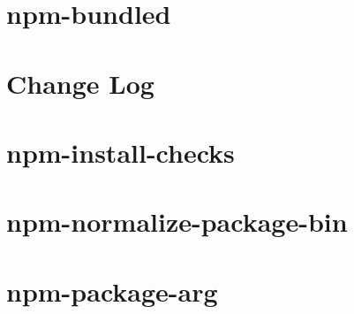 \documentclass[twoside]{book}
\newcommand{\+}{\discretionary{\mbox{\scriptsize$\hookleftarrow$}}{}{}}
\begin{document}
\chapter{npm-\/bundled}
\label{md__c___users_vaishnavi_jadhav__desktop__developer_code_mean_stack_example_client_node_modules_npm_bundled__r_e_a_d_m_e}

\chapter{Change Log}
\label{md__c___users_vaishnavi_jadhav__desktop__developer_code_mean_stack_example_client_node_modules_n7c5efdc491cb08cfc6e735b16ce2a9cf}

\chapter{npm-\/install-\/checks}
\label{md__c___users_vaishnavi_jadhav__desktop__developer_code_mean_stack_example_client_node_modules_npm_install_checks__r_e_a_d_m_e}

\chapter{npm-\/normalize-\/package-\/bin}
\label{md__c___users_vaishnavi_jadhav__desktop__developer_code_mean_stack_example_client_node_modules_nbe79518de610b2d54e51eb95f26b9a95}

\chapter{npm-\/package-\/arg}
\label{md__c___users_vaishnavi_jadhav__desktop__developer_code_mean_stack_example_client_node_modules_npm_package_arg__r_e_a_d_m_e}

\end{document}
